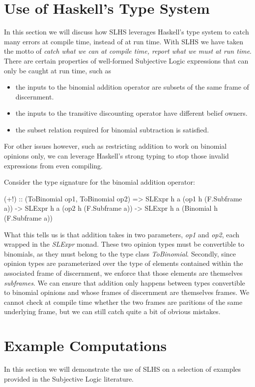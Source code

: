 \documentclass[thesis.tex]{subfiles}
\begin{document}
\section{Use of Haskell's Type System}

In this section we will discuss how SLHS leverages Haskell's type system to catch many errors
at compile time, instead of at run time. With SLHS we have taken the motto of \emph{catch what we
can at compile time, report what we must at run time}. There are certain properties of well-formed
Subjective Logic expressions that can only be caught at run time, such as

\begin{itemize}
  \item the inputs to the binomial addition operator are subsets of the same frame
    of discernment.
  \item the inputs to the transitive discounting operator have different belief
    owners.
  \item the subset relation required for binomial subtraction is satisfied.
\end{itemize}

For other issues however, such as restricting addition to work on binomial opinions only, we can
leverage Haskell's strong typing to stop those invalid expressions from even compiling.

Consider the type signature for the binomial addition operator:

\begin{spec}
(+!) :: (ToBinomial op1, ToBinomial op2)
       => SLExpr h a (op1 h (F.Subframe a))
       -> SLExpr h a (op2 h (F.Subframe a))
       -> SLExpr h a (Binomial h (F.Subframe a))
\end{spec}

What this tells us is that addition takes in two parameters, \emph{op1} and \emph{op2}, each wrapped in
the \emph{SLExpr} monad. These two opinion types must be convertible to binomials, as they must belong to
the type class \emph{ToBinomial}. Secondly, since opinion types are parameterized over the type of elements
contained within the associated frame of discernment, we enforce that those elements are themselves
\emph{subframes}. We can ensure that addition only happens between types convertible to binomial opinions
and whose frames of discernment are themselves frames. We cannot check at compile time whether the two
frames are paritions of the same underlying frame, but we can still catch quite a bit of obvious mistakes.




\section{Example Computations}

In this section we will demonstrate the use of SLHS on a selection of examples provided in the
Subjective Logic literature.
\end{document}
